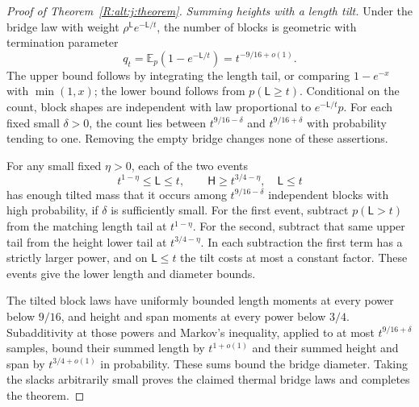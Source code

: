 \begin{proof}[Proof of Theorem~\ref{R:alt:j:theorem}]
\emph{Summing heights with a length tilt.}
Under the bridge law with weight $\rho^{\mathsf L}e^{-\mathsf L/t}$,
the number of blocks is geometric with termination parameter
\[
 q_t=\mathbb E_p(1-e^{-\mathsf L/t})=t^{-9/16+o(1)}.
\]
The upper bound follows by integrating the length tail, or comparing
$1-e^{-x}$ with $\min(1,x)$; the lower bound follows from
$p(\mathsf L\ge t)$. Conditional on the count, block shapes are independent
with law proportional to $e^{-\mathsf L/t}p$. For each fixed small
$\delta>0$, the count lies between $t^{9/16-\delta}$ and
$t^{9/16+\delta}$ with probability tending to one. Removing the empty
bridge changes none of these assertions.

For any small fixed $\eta>0$, each of the two events
\[
 t^{1-\eta}\le\mathsf L\le t,\qquad
 \mathsf H\ge t^{3/4-\eta},\quad \mathsf L\le t
\]
has enough tilted mass that it occurs among
$t^{9/16-\delta}$ independent blocks with high probability, if $\delta$
is sufficiently small. For the first event, subtract
$p(\mathsf L>t)$ from the matching length tail at $t^{1-\eta}$.
For the second, subtract that same upper tail from the height lower tail
at $t^{3/4-\eta}$. In each subtraction the first term has a strictly larger
power, and on $\mathsf L\le t$ the tilt costs at most a constant factor.
These events give the lower length and diameter bounds.

The tilted block laws have uniformly bounded length moments at every
power below $9/16$, and height and span moments at every power below
$3/4$. Subadditivity at those powers and Markov's inequality, applied to
at most $t^{9/16+\delta}$ samples, bound their summed length by
$t^{1+o(1)}$ and their summed height and span by $t^{3/4+o(1)}$ in
probability. These sums bound the bridge diameter. Taking the slacks
arbitrarily small proves the claimed thermal bridge laws and completes
the theorem.
\end{proof}
